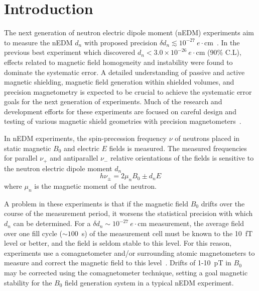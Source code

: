 \documentclass[review,number,sort&compress]{elsarticle}
\begin{document}
\linenumbers

\section{Introduction}


The next generation of neutron electric dipole moment (nEDM)
experiments aim to measure the nEDM $d_n$ with proposed precision
$\delta d_n\lesssim
10^{-27}~e\cdot$cm~\cite{bib:nedm2,bib:nedm2.5,bib:nedm3,bib:nedm3.5,bib:nedm5,bib:nedm6,bib:nedm6.5,bib:nedmtriumf}.
In the previous best experiment \cite{bib:baker,bib:pendlebury} which
discovered $d_n<3.0\times 10^{-26}~e\cdot$cm (90\% C.L), effects
related to magnetic field homogeneity and instability were found to
dominate the systematic error.  A detailed understanding of passive
and active magnetic shielding, magnetic field generation within
shielded volumes, and precision magnetometry is expected to be crucial
to achieve the systematic error goals for the next generation of
experiments.  Much of the research and development efforts for these
experiments are focused on careful design and testing of various
magnetic shield geometries with precision
magnetometers~\cite{bib:brys,bib:afach,bib:fierlingerroom,bib:sturmthesis,bib:patton}.

In nEDM experiments, the spin-precession frequency $\nu$ of neutrons
placed in static magnetic $B_0$ and electric $E$ fields is measured.
The measured frequencies for parallel $\nu_+$ and antiparallel $\nu_-$
relative orientations of the fields is sensitive to the neutron
electric dipole moment $d_n$
\begin{equation}
h\nu_\pm=2\mu_nB_0\pm d_nE
\end{equation}
where $\mu_n$ is the magnetic moment of the neutron.

A problem in these experiments is that if the magnetic field $B_0$
drifts over the course of the measurement period, it worsens the
statistical precision with which $d_n$ can be determined.  For a
$\delta d_n\sim 10^{-27}~e\cdot$cm measurement, the average field over
one fill cycle ($\sim 100$~s) of the measurement cell must be known to
the 10~fT level or better, and the field is seldom stable to this
level.  For this reason, experiments use a comagnetometer and/or
surrounding atomic magnetometers to measure and correct the magnetic
field to this level~\cite{bib:baker,bib:brys,bib:afach}.  Drifts of
1-10~pT in $B_0$ may be corrected using the comagnetometer technique,
setting a goal magnetic stability for the $B_0$ field generation
system in a typical nEDM experiment.
\end{document}
